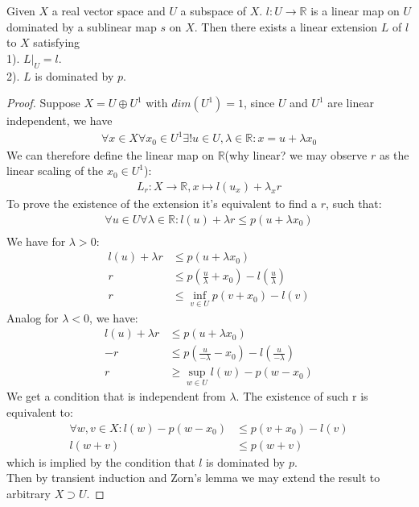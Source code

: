 \begin{theorem}
	Given $X$ a real vector space and $U$ a subspace of $X$. $l: U \rightarrow \mathbb{R}$ is a linear map on $U$ dominated by a sublinear map $s$ on $X$. Then there exists a linear extension $L$ of $l$ to $X$ satisfying\\
	 1). $L|_U = l$.\\
	 2). $L$ is dominated by $p$.  
\end{theorem}
\begin{proof}
	Suppose $X = U \oplus U^1$ with $dim(U^1) = 1$, since $U$ and $U^1$ are linear independent, we have
	\begin{align*}
		\forall x \in X \forall x_0 \in U^1 \exists!u \in U, \lambda \in \mathbb{R} :
		 x = u + \lambda x_0
	\end{align*}
	We can therefore define the linear map on $\mathbb{R}$(why linear? we may observe $r$ as the linear scaling of the $x_0 \in U^1$):
	\begin{align*}
		L_r: X \rightarrow \mathbb{R}, x \mapsto l(u_x) + \lambda _xr
	\end{align*}
	To prove the existence of the extension it's equivalent to find a $r$, such that:
	\begin{align*}
		\forall u \in U \forall \lambda \in \mathbb{R} :
		 l(u) + \lambda r \leq p(u + \lambda x_0)\\
	\end{align*} 
	We have for $\lambda > 0$:
	\begin{align*}
		l(u) + \lambda r &\leq p(u + \lambda x_0)\\
		r &\leq p(\frac{u}{\lambda} + x_0)- l(\frac{u}{\lambda})\\
		r &\leq \inf_{v \in U}p(v + x_0) - l(v)
	\end{align*}
	Analog for $\lambda < 0$, we have:
	\begin{align*}
		l(u) + \lambda r &\leq p(u + \lambda x_0)\\
		-r &\leq p(\frac{u}{-\lambda} - x_0)- l(\frac{u}{-\lambda})\\
		r &\geq \sup_{w \in U}l(w) - p(w - x_0)  
	\end{align*}
	We get a condition that is independent from $\lambda$. The existence of such r is equivalent to:
	\begin{align*}
		\forall w, v \in X:  l(w) - p(w - x_0) &\leq p(v + x_0) - l(v) \\
		l(w + v ) &\leq p(w + v)
	\end{align*}
	which is implied by the condition that $l$ is dominated by $p$.\\
	Then by transient induction and Zorn's lemma we may extend the result to arbitrary $X \supset U $.
\end{proof}

